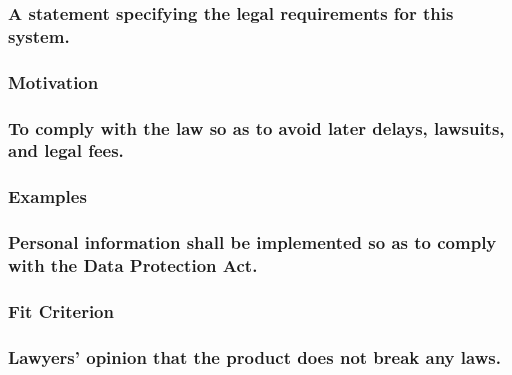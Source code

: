 \documentclass[
]{article}
\begin{document}
\hypertarget{a-statement-specifying-the-legal-requirements-for-this-system.}{%
\subsubsection{A statement specifying the legal requirements for this
system.}\label{a-statement-specifying-the-legal-requirements-for-this-system.}}

\hypertarget{motivation-57}{%
\subsubsection{Motivation}\label{motivation-57}}

\hypertarget{to-comply-with-the-law-so-as-to-avoid-later-delays-lawsuits-and-legal-fees.}{%
\subsubsection{To comply with the law so as to avoid later delays,
lawsuits, and legal
fees.}\label{to-comply-with-the-law-so-as-to-avoid-later-delays-lawsuits-and-legal-fees.}}

\hypertarget{examples-39}{%
\subsubsection{Examples}\label{examples-39}}

\hypertarget{personal-information-shall-be-implemented-so-as-to-comply-with-the-data-protection-act.}{%
\subsubsection{Personal information shall be implemented so as to comply
with the Data Protection
Act.}\label{personal-information-shall-be-implemented-so-as-to-comply-with-the-data-protection-act.}}

\hypertarget{fit-criterion-12}{%
\subsubsection{Fit Criterion}\label{fit-criterion-12}}

\hypertarget{lawyers-opinion-that-the-product-does-not-break-any-laws.}{%
\subsubsection{Lawyers' opinion that the product does not break any
laws.}\label{lawyers-opinion-that-the-product-does-not-break-any-laws.}}
\end{document}

